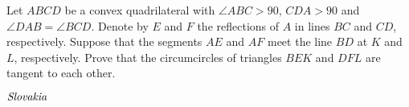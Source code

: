 Let $ABCD$ be a convex quadrilateral with $\angle ABC>90$, $CDA>90$ and $\angle DAB=\angle BCD$. Denote by $E$ and $F$ the reflections of $A$ in lines $BC$ and $CD$, respectively. Suppose that the segments $AE$ and $AF$ meet the line $BD$ at $K$ and $L$, respectively. Prove that the circumcircles of triangles $BEK$ and $DFL$ are tangent to each other.

$\emph{Slovakia}$